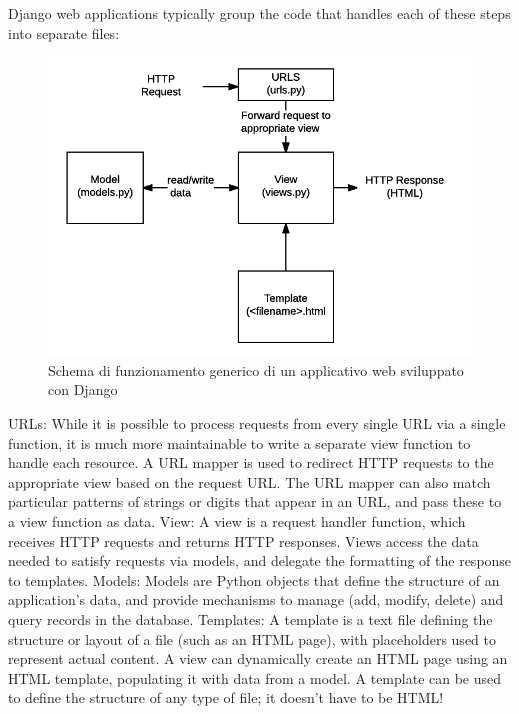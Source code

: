 Django web applications typically group the code that handles each of these steps into separate files:

\begin{figure}[ht!]
    \centering
	\includegraphics[scale=0.9]{images/Djnago_doc.png}
	\caption{Schema di funzionamento generico di un applicativo web sviluppato con Django}
\end{figure}

URLs: While it is possible to process requests from every single URL via a single function, it is much more maintainable to write 
a separate view function to handle each resource. A URL mapper is used to redirect HTTP requests to the appropriate view based on 
the request URL. The URL mapper can also match particular patterns of strings or digits that appear in an URL, and pass these to a 
view function as data.
View: A view is a request handler function, which receives HTTP requests and returns HTTP responses. Views access the data needed to 
satisfy requests via models, and delegate the formatting of the response to templates.
Models: Models are Python objects that define the structure of an application's data, and provide mechanisms to manage (add, modify, 
delete) and query records in the database. 
Templates: A template is a text file defining the structure or layout of a file (such as an HTML page), with placeholders used to 
represent actual content. A view can dynamically create an HTML page using an HTML template, populating it with data from a model. 
A template can be used to define the structure of any type of file; it doesn't have to be HTML!
\cite{mdn-django-documentation} \cite{django-documentation}



